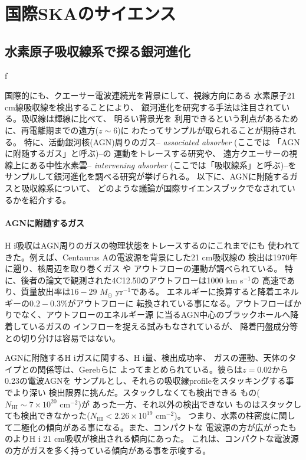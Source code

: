 \section{国際SKAのサイエンス}\label{galaxy.s2}

\subsection{水素原子吸収線系で探る銀河進化}
\label{subsec:international_21cm}f

国際的にも、クエーサー電波連続光を背景にして、視線方向にある
水素原子21 cm線吸収線を検出することにより、
銀河進化を研究する手法は注目されている。吸収線は輝線に比べて、
明るい背景光を
利用できるという利点があるために、再電離期までの遠方($z\sim 6$)に
わたってサンプルが取られることが期待される。
特に、活動銀河核(AGN)周りのガス-- \textit{associated absorber} (ここでは
「AGNに附随するガス」と呼ぶ)--の
運動をトレースする研究や、
遠方クエーサーの視線上にある中性水素雲-- \textit{intervening absorber}
(ここでは「吸収線系」と呼ぶ)--を
サンプルして銀河進化を調べる研究が挙げられる\citep{morganti14}。
以下に、AGNに附随するガスと吸収線系について、
どのような議論が国際サイエンスブックでなされているかを紹介する。

\paragraph{AGNに附随するガス}

H {\sc i}吸収はAGN周りのガスの物理状態をトレースするのにこれまでにも
使われてきた。例えば、Centaurus Aの電波源を背景にした21 cm吸収線の
検出は1970年に遡り\citep{1970ApJ...161L...9R}、核周辺を取り巻くガス
\citep{2008A&A...485L...5M,2012A&A...546A..22S}や
アウトフロー\citep{2013Sci...341.1082M}の運動が調べられている。
特に、後者の論文で観測された4C12.50のアウトフローは1000 km s$^{-1}$の
高速であり、質量放出率は$16-29$ $M_\odot$ yr$^{-1}$である。
エネルギーに換算すると降着エネルギーの$0.2-0.3\%$がアウトフローに
転換されている事になる。アウトフローばかりでなく、アウトフローのエネルギー源
に当るAGN中心のブラックホールへ降着しているガスの
インフローを捉える試みもなされているが\citep{1989AJ.....97..708V}、
降着円盤成分等との切り分けは容易ではない。

AGNに附随するH {\sc i}ガスに関する、H {\sc i}量、検出成功率、
ガスの運動、天体のタイプとの関係等は、Gerebら\citep{gereb14}に
よってまとめられている。彼らは$z=0.02$から0.23の電波AGNを
サンプルとし、それらの吸収線profileをスタッキングする事でより深い
検出限界に挑んだ。スタックしなくても検出できる
もの($N_\mathrm{HI}\sim 7\times 10^{20}$ cm$^{-2}$)が
あった一方、それ以外の検出できない
ものはスタックしても検出できなかった($N_\mathrm{HI}<2.26\times 10^{19}$ cm$^{-2}$)。
つまり、水素の柱密度に関して二極化の傾向がある事になる。また、コンパクトな
電波源の方が広がったものよりH {\sc i} 21 cm吸収が検出される傾向にあった。
これは、コンパクトな電波源の方がガスを多く持っている傾向がある事を示唆する。

